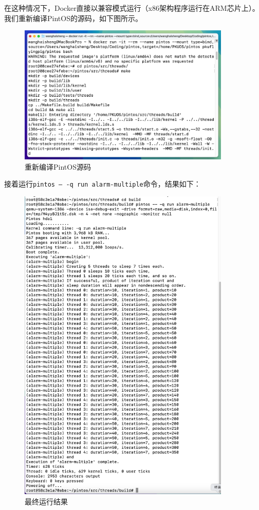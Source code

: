 \documentclass{article}
\begin{document}
在这种情况下，Docker直接以兼容模式运行（x86架构程序运行在ARM芯片上）。我们重新编译PintOS的源码，如下图所示。

\begin{figure}[H]
	\centering
	\includegraphics[width=0.9\textwidth]{img/docker_make.png}
	\caption{重新编译PintOS源码}
\end{figure}

接着运行\texttt{pintos -- -q run alarm-multiple}命令，结果如下：

\begin{figure}[H]
	\centering
	\includegraphics[width=0.9\textwidth]{img/docker_result.png}
	\caption{最终运行结果}
\end{figure}
\end{document}
